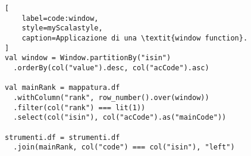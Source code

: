 \begin{lstlisting}[
    label=code:window,
    style=myScalastyle,
    caption=Applicazione di una \textit{window function}.
]
val window = Window.partitionBy("isin")
  .orderBy(col("value").desc, col("acCode").asc)

val mainRank = mappatura.df
  .withColumn("rank", row_number().over(window))
  .filter(col("rank") === lit(1))
  .select(col("isin"), col("acCode").as("mainCode"))

strumenti.df = strumenti.df
  .join(mainRank, col("code") === col("isin"), "left")
\end{lstlisting}